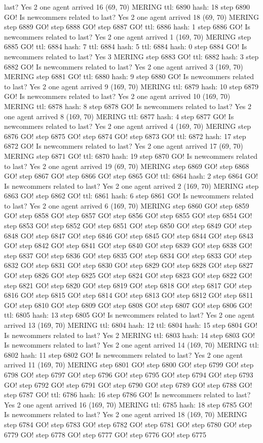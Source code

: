 last? Yes 2 one agent arrived 16 (69, 70) MERING ttl: 6890 hash: 18 step 6890 GO! Is newcommers related to last? Yes 2 one agent arrived 18 (69, 70) MERING step 6889 GO! step 6888 GO! step 6887 GO! ttl: 6886 hash: 1 step 6886 GO! Is newcommers related to last? Yes 2 one agent arrived 1 (169, 70) MERING step 6885 GO! ttl: 6884 hash: 7 ttl: 6884 hash: 5 ttl: 6884 hash: 0 step 6884 GO! Is newcommers related to last? Yes 3 MERING step 6883 GO! ttl: 6882 hash: 3 step 6882 GO! Is newcommers related to last? Yes 2 one agent arrived 3 (169, 70) MERING step 6881 GO! ttl: 6880 hash: 9 step 6880 GO! Is newcommers related to last? Yes 2 one agent arrived 9 (169, 70) MERING ttl: 6879 hash: 10 step 6879 GO! Is newcommers related to last? Yes 2 one agent arrived 10 (169, 70) MERING ttl: 6878 hash: 8 step 6878 GO! Is newcommers related to last? Yes 2 one agent arrived 8 (169, 70) MERING ttl: 6877 hash: 4 step 6877 GO! Is newcommers related to last? Yes 2 one agent arrived 4 (169, 70) MERING step 6876 GO! step 6875 GO! step 6874 GO! step 6873 GO! ttl: 6872 hash: 17 step 6872 GO! Is newcommers related to last? Yes 2 one agent arrived 17 (69, 70) MERING step 6871 GO! ttl: 6870 hash: 19 step 6870 GO! Is newcommers related to last? Yes 2 one agent arrived 19 (69, 70) MERING step 6869 GO! step 6868 GO! step 6867 GO! step 6866 GO! step 6865 GO! ttl: 6864 hash: 2 step 6864 GO! Is newcommers related to last? Yes 2 one agent arrived 2 (169, 70) MERING step 6863 GO! step 6862 GO! ttl: 6861 hash: 6 step 6861 GO! Is newcommers related to last? Yes 2 one agent arrived 6 (169, 70) MERING step 6860 GO! step 6859 GO! step 6858 GO! step 6857 GO! step 6856 GO! step 6855 GO! step 6854 GO! step 6853 GO! step 6852 GO! step 6851 GO! step 6850 GO! step 6849 GO! step 6848 GO! step 6847 GO! step 6846 GO! step 6845 GO! step 6844 GO! step 6843 GO! step 6842 GO! step 6841 GO! step 6840 GO! step 6839 GO! step 6838 GO! step 6837 GO! step 6836 GO! step 6835 GO! step 6834 GO! step 6833 GO! step 6832 GO! step 6831 GO! step 6830 GO! step 6829 GO! step 6828 GO! step 6827 GO! step 6826 GO! step 6825 GO! step 6824 GO! step 6823 GO! step 6822 GO! step 6821 GO! step 6820 GO! step 6819 GO! step 6818 GO! step 6817 GO! step 6816 GO! step 6815 GO! step 6814 GO! step 6813 GO! step 6812 GO! step 6811 GO! step 6810 GO! step 6809 GO! step 6808 GO! step 6807 GO! step 6806 GO! ttl: 6805 hash: 13 step 6805 GO! Is newcommers related to last? Yes 2 one agent arrived 13 (169, 70) MERING ttl: 6804 hash: 12 ttl: 6804 hash: 15 step 6804 GO! Is newcommers related to last? Yes 2 MERING ttl: 6803 hash: 14 step 6803 GO! Is newcommers related to last? Yes 2 one agent arrived 14 (169, 70) MERING ttl: 6802 hash: 11 step 6802 GO! Is newcommers related to last? Yes 2 one agent arrived 11 (169, 70) MERING step 6801 GO! step 6800 GO! step 6799 GO! step 6798 GO! step 6797 GO! step 6796 GO! step 6795 GO! step 6794 GO! step 6793 GO! step 6792 GO! step 6791 GO! step 6790 GO! step 6789 GO! step 6788 GO! step 6787 GO! ttl: 6786 hash: 16 step 6786 GO! Is newcommers related to last? Yes 2 one agent arrived 16 (169, 70) MERING ttl: 6785 hash: 18 step 6785 GO! Is newcommers related to last? Yes 2 one agent arrived 18 (169, 70) MERING step 6784 GO! step 6783 GO! step 6782 GO! step 6781 GO! step 6780 GO! step 6779 GO! step 6778 GO! step 6777 GO! step 6776 GO! step 6775 